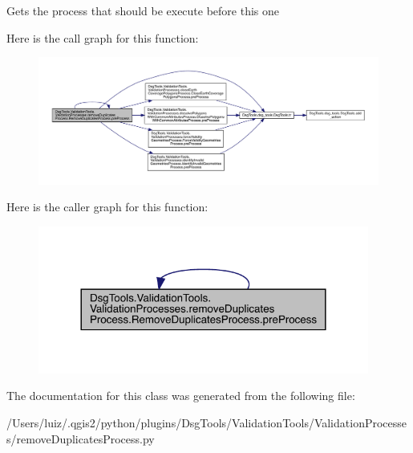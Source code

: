 \begin{DoxyVerb}Gets the process that should be execute before this one
\end{DoxyVerb}
 Here is the call graph for this function\+:
\nopagebreak
\begin{figure}[H]
\begin{center}
\leavevmode
\includegraphics[width=350pt]{class_dsg_tools_1_1_validation_tools_1_1_validation_processes_1_1remove_duplicates_process_1_1_remove_duplicates_process_a2f158eba7f758907bc60950685c97b47_cgraph}
\end{center}
\end{figure}
Here is the caller graph for this function\+:
\nopagebreak
\begin{figure}[H]
\begin{center}
\leavevmode
\includegraphics[width=308pt]{class_dsg_tools_1_1_validation_tools_1_1_validation_processes_1_1remove_duplicates_process_1_1_remove_duplicates_process_a2f158eba7f758907bc60950685c97b47_icgraph}
\end{center}
\end{figure}


The documentation for this class was generated from the following file\+:\begin{DoxyCompactItemize}
\item 
/\+Users/luiz/.\+qgis2/python/plugins/\+Dsg\+Tools/\+Validation\+Tools/\+Validation\+Processes/remove\+Duplicates\+Process.\+py\end{DoxyCompactItemize}
